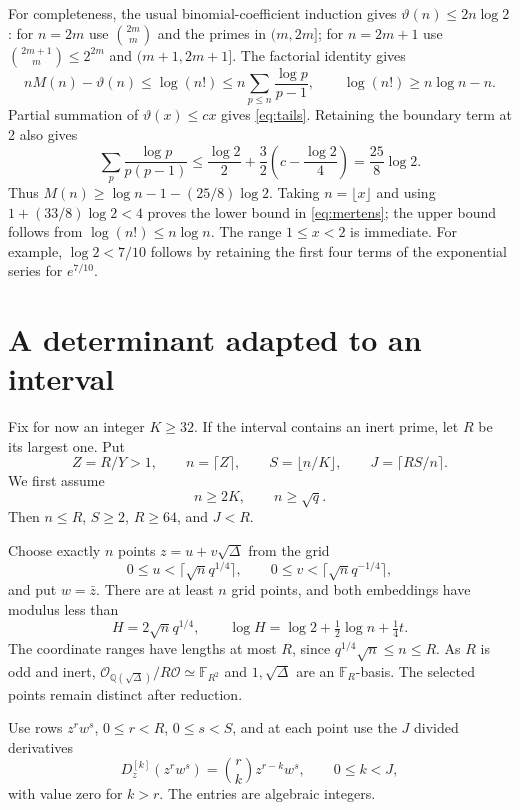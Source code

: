 \documentclass[11pt]{article}
\newcommand{\Q}{\mathbb Q}
\newcommand{\F}{\mathbb F}
\newcommand{\OO}{\mathcal O}
\begin{document}
For completeness, the usual binomial-coefficient induction gives
$\vartheta(n)\le2n\log2$: for $n=2m$ use $\binom{2m}{m}$ and
the primes in $(m,2m]$; for $n=2m+1$ use
$\binom{2m+1}{m}\le2^{2m}$ and $(m+1,2m+1]$.
The factorial identity gives
\[
 nM(n)-\vartheta(n)\le\log(n!)
 \le n\sum_{p\le n}\frac{\log p}{p-1},\qquad
 \log(n!)\ge n\log n-n.
\]
Partial summation of $\vartheta(x)\le cx$ gives
\eqref{eq:tails}. Retaining the boundary term at 2 also gives
\[
 \sum_p\frac{\log p}{p(p-1)}
 \le\frac{\log2}{2}+\frac32
       \left(c-\frac{\log2}{4}\right)=\frac{25}{8}\log2.
\]
Thus $M(n)\ge\log n-1-(25/8)\log2$. Taking $n=\lfloor x\rfloor$
and using $1+(33/8)\log2<4$ proves the lower bound in
\eqref{eq:mertens}; the upper bound follows from
$\log(n!)\le n\log n$. The range $1\le x<2$ is immediate.
For example, $\log2<7/10$ follows by retaining the first four
terms of the exponential series for $e^{7/10}$.

\section{A determinant adapted to an interval}
Fix for now an integer $K\ge32$. If the interval contains an inert
prime, let $R$ be its largest one. Put
\begin{equation}\label{eq:parameters}
 Z=R/Y>1,\qquad n=\lceil Z\rceil,\qquad
 S=\lfloor n/K\rfloor,\qquad J=\lceil RS/n\rceil.
\end{equation}
We first assume
\begin{equation}\label{eq:nontrivial-range}
 n\ge2K,\qquad n\ge\sqrt q.
\end{equation}
Then $n\le R$, $S\ge2$, $R\ge64$, and $J<R$.

Choose exactly $n$ points $z=u+v\sqrt\Delta$ from the grid
\[
 0\le u<\lceil\sqrt n q^{1/4}\rceil,
 \qquad 0\le v<\lceil\sqrt n q^{-1/4}\rceil,
\]
and put $w=\bar z$. There are at least $n$ grid points, and both
embeddings have modulus less than
\begin{equation}\label{eq:height}
 H=2\sqrt n q^{1/4},\qquad
 \log H=\log2+\tfrac12\log n+\tfrac14t.
\end{equation}
The coordinate ranges have lengths at most $R$, since
$q^{1/4}\sqrt n\le n\le R$. As $R$ is odd and inert,
$\OO_{\Q(\sqrt\Delta)}/R\OO\simeq\F_{R^2}$ and
$1,\sqrt\Delta$ are an $\F_R$-basis. The selected points remain
distinct after reduction.

Use rows $z^rw^s$, $0\le r<R$, $0\le s<S$, and at each point
use the $J$ divided derivatives
\[
 D_z^{[k]}(z^rw^s)=\binom rk z^{r-k}w^s,\qquad 0\le k<J,
\]
with value zero for $k>r$. The entries are algebraic integers.
\end{document}

